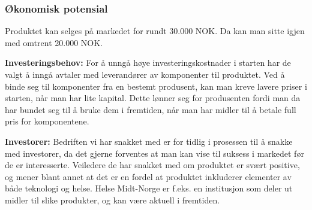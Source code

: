 \subsubsection{Økonomisk potensial}

Produktet kan selges på markedet for rundt 30.000 NOK. Da kan man sitte igjen med omtrent 20.000 NOK.


\textbf{Investeringsbehov:}
For å unngå høye investeringskostnader i starten har de valgt å inngå avtaler med leverandører av komponenter til produktet. Ved å binde seg til komponenter fra en bestemt produsent, kan man kreve lavere priser i starten, når man har lite kapital. Dette lønner seg for produsenten fordi man da har bundet seg til å bruke dem i fremtiden, når man har midler til å betale full pris for komponentene.

\textbf{Investorer:}
Bedriften vi har snakket med er for tidlig i prosessen til å snakke med investorer, da det gjerne forventes at man kan vise til suksess i markedet før de er interesserte.
Veiledere de har snakket med om produktet er svært positive, og mener blant annet at det er en fordel at produktet inkluderer elementer av både teknologi og helse. Helse Midt-Norge er f.eks. en institusjon som deler ut midler til slike produkter, og kan være aktuell i fremtiden.
